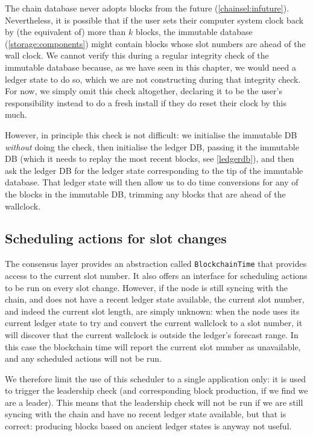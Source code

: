 The chain database never adopts blocks from the future
(\cref{chainsel:infuture}). Nevertheless, it is possible that if the user sets
their computer system clock back by (the equivalent of) more than $k$ blocks,
the immutable database (\cref{storage:components}) might contain blocks
whose slot numbers are ahead of the wall clock. We cannot verify this during a
regular integrity check of the immutable database because, as we have seen in
this chapter, we would need a ledger state to do so, which we are not
constructing during that integrity check. For now, we simply omit this check
altogether, declaring it to be the user's responsibility instead to do a
fresh install if they do reset their clock by this much.

However, in principle this check is not difficult: we initialise the immutable
DB \emph{without} doing the check, then initialise the ledger DB, passing it the
immutable DB (which it needs to replay the most recent blocks, see
\cref{ledgerdb}), and then ask the ledger DB for the ledger state
corresponding to the tip of the immutable database. That ledger state will then
allow us to do time conversions for any of the blocks in the immutable DB,
trimming any blocks that are ahead of the wallclock.

\subsection{Scheduling actions for slot changes}
\label{time:scheduling-actions}

The consensus layer provides an abstraction called \lstinline!BlockchainTime!
that provides access to the current slot number. It also offers an interface for
scheduling actions to be run on every slot change. However, if the node is still
syncing with the chain, and does not have a recent ledger state available, the
current slot number, and indeed the current slot length, are simply unknown:
when the node uses its current ledger state to  try and convert the current
wallclock to a slot number, it will discover that  the current wallclock is
outside the ledger's forecast range. In this case the blockchain time will
report the current slot number as unavailable, and any scheduled actions will
not be run.

We therefore limit the use of this scheduler to a single application only:
it is used to trigger the leadership check (and corresponding block
production, if we find we are a leader). This means that the leadership
check will not be run if we are still syncing with the chain and have no
recent ledger state available, but that is correct: producing blocks based on
ancient ledger states is anyway not useful.

